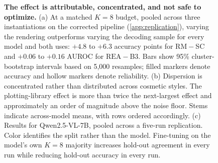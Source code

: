 \documentclass[11pt]{article}
\newcommand{\rea}{\mathrm{REA}}
\newcommand{\rmg}{\mathrm{RM}}
\begin{document}
\begin{figure}[!t]
\caption{\textbf{The effect is attributable, concentrated, and not safe to optimize.}
(a) At a matched $K{=}8$ budget, pooled across three instantiations on the corrected pipeline (\cref{app:replication}), varying the rendering outperforms varying the decoding sample for every model and both uses: $+4.8$ to $+6.3$ accuracy points for $\rmg{-}$SC and $+0.06$ to $+0.16$ AUROC for $\rea{-}$B3. Bars show 95\% cluster-bootstrap intervals based on 5,000 resamples; filled markers denote accuracy and hollow markers denote reliability.
(b) Dispersion is concentrated rather than distributed across cosmetic styles. The plotting-library effect is more than twice the next-largest effect and approximately an order of magnitude above the noise floor. Stems indicate across-model means, with rows ordered accordingly.
(c) Results for Qwen2.5-VL-7B, pooled across a five-run replication. Color identifies the split rather than the model. Fine-tuning on the model's own $K{=}8$ majority increases hold-out agreement in every run while reducing hold-out accuracy in every run.}
\label{fig:results}
\end{figure}


\begin{table}[t]
\centering
\caption{\textbf{The paper's four predictions,} each evaluated across three independent RENDEQ instantiations (\cref{sec:experiments}). $^\dagger$See \cref{sec:coupling} for model-level results and \cref{app:replication} for the earlier retracted reversal.}
\label{tab:predictions}
\scriptsize
\setlength{\tabcolsep}{2.2pt}
\renewcommand{\arraystretch}{1.05}
\end{table}
\end{document}

